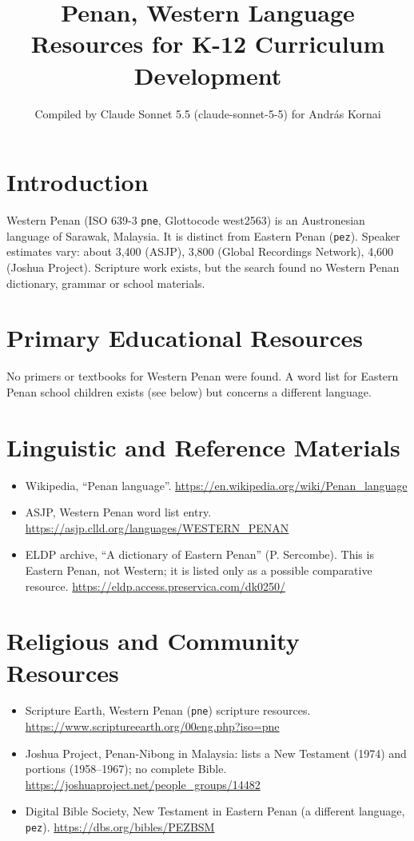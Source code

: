 \documentclass[12pt]{article}
\title{Penan, Western Language Resources for K-12 Curriculum Development}
\author{Compiled by Claude Sonnet 5.5 (claude-sonnet-5-5) for Andr\'as Kornai}
\date{}
\begin{document}
\maketitle

\section{Introduction}
Western Penan (ISO 639-3 \texttt{pne}, Glottocode west2563) is an Austronesian language of Sarawak, Malaysia. It is distinct from Eastern Penan (\texttt{pez}). Speaker estimates vary: about 3,400 (ASJP), 3,800 (Global Recordings Network), 4,600 (Joshua Project). Scripture work exists, but the search found no Western Penan dictionary, grammar or school materials.

\section{Primary Educational Resources}
No primers or textbooks for Western Penan were found. A word list for Eastern Penan school children exists (see below) but concerns a different language.

\section{Linguistic and Reference Materials}
\begin{itemize}
\item Wikipedia, ``Penan language''. \url{https://en.wikipedia.org/wiki/Penan_language}
\item ASJP, Western Penan word list entry. \url{https://asjp.clld.org/languages/WESTERN_PENAN}
\item ELDP archive, ``A dictionary of Eastern Penan'' (P. Sercombe). This is Eastern Penan, not Western; it is listed only as a possible comparative resource. \url{https://eldp.access.preservica.com/dk0250/}
\end{itemize}

\section{Religious and Community Resources}
\begin{itemize}
\item Scripture Earth, Western Penan (\texttt{pne}) scripture resources. \url{https://www.scriptureearth.org/00eng.php?iso=pne}
\item Joshua Project, Penan-Nibong in Malaysia: lists a New Testament (1974) and portions (1958--1967); no complete Bible. \url{https://joshuaproject.net/people_groups/14482}
\item Digital Bible Society, New Testament in Eastern Penan (a different language, \texttt{pez}). \url{https://dbs.org/bibles/PEZBSM}
\end{itemize}
\end{document}
